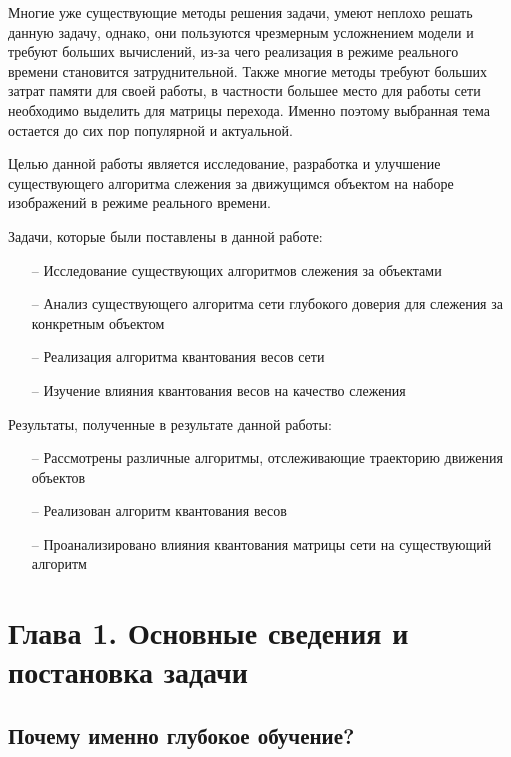 \documentclass[14pt, a4paper]{article}
\begin{document}
Многие уже существующие методы решения задачи, умеют неплохо решать данную задачу, однако, они пользуются чрезмерным усложнением модели и требуют больших вычислений, из-за чего реализация в режиме реального времени становится затруднительной. Также многие методы требуют больших затрат памяти для своей работы, в частности большее место для работы сети необходимо выделить для матрицы перехода. Именно поэтому выбранная тема остается до сих пор популярной и актуальной. 

Целью данной работы является исследование, разработка и улучшение существующего алгоритма слежения за движущимся объектом на наборе изображений в режиме реального времени.

Задачи, которые были поставлены в данной работе:
\begin{itemize}[leftmargin=0em, itemindent=2.5 em,itemsep=1.5 pt,parsep=1.5 pt]
        \item[--] Исследование существующих алгоритмов слежения за объектами 
        \item[--] Анализ существующего алгоритма сети глубокого доверия для слежения за конкретным объектом
        \item[--] Реализация алгоритма квантования весов сети
        \item[--] Изучение влияния квантования весов на качество слежения 
\end{itemize}
Результаты, полученные в результате данной работы:
\begin{itemize}[leftmargin=0em, itemindent=2.5 em,itemsep=1.5 pt,parsep=1.5 pt]
    \item[--] Рассмотрены различные алгоритмы, отслеживающие траекторию движения объектов
    \item[--] Реализован алгоритм квантования весов 
    \item[--] Проанализировано влияния квантования матрицы сети на существующий алгоритм
\end{itemize}

\newpage
\section*{Глава 1. Основные сведения и постановка задачи}
\setcounter{section}{1}

\subsection{Почему именно глубокое обучение?}
\end{document}
